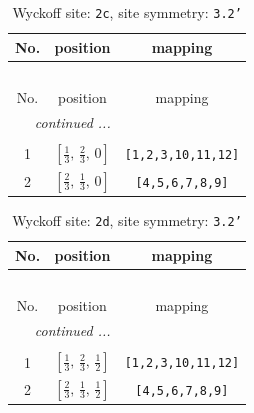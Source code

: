 \documentclass[fleqn,8pt]{jsarticle}
\begin{document}
\begin{longtable}{ccc}
\caption{Wyckoff site: {\tt 2c}, site symmetry: {\tt 3.2'}}
 \\
 \hline \hline
No. & position & mapping \\ \hline \endfirsthead

\multicolumn{2}{l}{\tablename\ \thetable{}} \\
 \hline \hline
No. & position & mapping \\ \hline \endhead

 \hline \hline
\multicolumn{2}{r}{\footnotesize\it continued ...} \\ \endfoot

 \hline \hline
\multicolumn{2}{r}{} \\ \endlastfoot

1 & $\left[ \frac{1}{3},\, \frac{2}{3},\, 0 \right]$ & {\tt [1,2,3,10,11,12]} \\ \hline
2 & $\left[ \frac{2}{3},\, \frac{1}{3},\, 0 \right]$ & {\tt [4,5,6,7,8,9]} \\
\end{longtable}
\renewcommand{\arraystretch}{1.2}
\begin{longtable}{ccc}
\caption{Wyckoff site: {\tt 2d}, site symmetry: {\tt 3.2'}}
 \\
 \hline \hline
No. & position & mapping \\ \hline \endfirsthead

\multicolumn{2}{l}{\tablename\ \thetable{}} \\
 \hline \hline
No. & position & mapping \\ \hline \endhead

 \hline \hline
\multicolumn{2}{r}{\footnotesize\it continued ...} \\ \endfoot

 \hline \hline
\multicolumn{2}{r}{} \\ \endlastfoot

1 & $\left[ \frac{1}{3},\, \frac{2}{3},\, \frac{1}{2} \right]$ & {\tt [1,2,3,10,11,12]} \\ \hline
2 & $\left[ \frac{2}{3},\, \frac{1}{3},\, \frac{1}{2} \right]$ & {\tt [4,5,6,7,8,9]} \\
\end{longtable}
\renewcommand{\arraystretch}{1.2}
\end{document}
